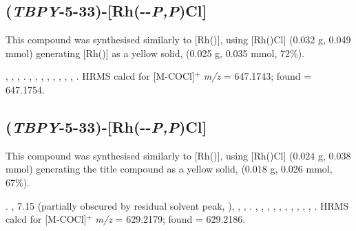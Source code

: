
\subsection*{(\emph{TBPY}-5-33)-[Rh(\tButhixantphos--\emph{P,P}\textprime)Cl]}


This compound was synthesised similarly to [Rh(\tBusixantphos)], using [Rh(\tButhixantphos)Cl] (0.032 g, 0.049 mmol) generating [Rh(\tButhixantphos)] as a yellow solid, (0.025 g, 0.035 mmol, 72\%).  

,
,
,
.
,
,
,
,
,
,
,
,
.
HRMS calcd for  [M-COCl]$^+$ \emph{m/z} = 647.1743; found = 647.1754.


\subsection*{(\emph{TBPY}-5-33)-[Rh(\tButhixantphos--\emph{P,P}\textprime)Cl]}


This compound was synthesised similarly to [Rh(\tBusixantphos)], using [Rh(\tBuxantphos)Cl] (0.024 g, 0.038 mmol) generating the title compound as a yellow solid, (0.018 g, 0.026 mmol, 67\%).  

.
,
7.15 (partially obscured by residual solvent peak, \CtBuaH),
,
,
.
,
,
,
,
,
,
,
,
,
,
.
HRMS calcd for  [M-COCl]$^+$ \emph{m/z} = 629.2179; found = 629.2186.


